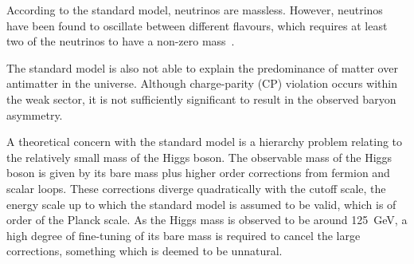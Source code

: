 According to the standard model, neutrinos are massless. However, neutrinos 
have been found to oscillate between different flavours, which requires at 
least two of the neutrinos to have a non-zero 
mass~\cite{neutrino-osc1,neutrino-osc2}.

The standard model is also not able to explain the predominance of matter over 
antimatter in the universe. Although charge-parity (CP) violation occurs within 
the weak sector, it is not sufficiently significant to result in the observed 
baryon asymmetry.

A theoretical concern with the standard model is a hierarchy problem relating 
to the relatively small mass of the Higgs boson. The observable mass of the 
Higgs boson is given by its bare mass plus higher order corrections from 
fermion and scalar loops. These 
corrections diverge quadratically with the cutoff scale, the energy scale up to 
which the standard model is assumed to be valid, which is of order of the %
Planck scale. 
As the Higgs mass is observed to be around 125~GeV, a high degree of 
fine-tuning of its bare mass is required to cancel the large corrections, 
something which is deemed to be unnatural. %

